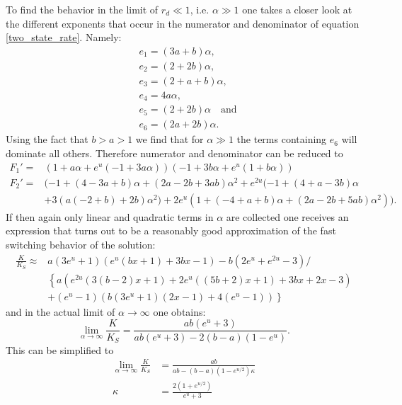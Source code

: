 To find the behavior in the limit of $r_d \ll 1 $, i.e. $\alpha \gg 1$ one takes a closer look at the different exponents that occur in the numerator and denominator of equation \eqref{two_state_rate}. Namely:
\begin{align}
& e_1 = (3a+b)\alpha, \nonumber \\
& e_2 = (2+2b)\alpha, \nonumber \\
& e_3 = (2+a+b)\alpha, \nonumber \\
& e_4 = 4a\alpha, \nonumber \\
& e_5 = (2+2b)\alpha \quad \textrm{and} \nonumber \\
& e_6 = (2a+2b)\alpha.
\end{align}
Using the fact that $b > a > 1$ we find that for $\alpha \gg 1$ the terms containing $e_6$ will dominate all others. Therefore numerator and denominator can be reduced to
\begin{align*}
    F_1' =& ( 1 + a \alpha + e^u (-1 + 3 a \alpha)) (-1 + 3 b \alpha + e^u (1 + b \alpha))\\
    F_2' =& (-1 + (4 - 3 a + b) \alpha + (2 a - 2 b + 3 a b) \alpha^2 + e^{2 u} (-1 + (4 + a - 3 b) \alpha \\
          &+ 3 (a (-2 + b) + 2 b) \alpha^2) + 2 e^u (1 + (-4 + a + b) \alpha + (2 a - 2 b + 5 a b) \alpha^2)).
\end{align*}
If then again only linear and quadratic terms in $\alpha$ are collected one receives an expression that turns out to be a reasonably good approximation of the fast switching behavior of the solution: 
\begin{align}
    \frac{K}{K_{S}} \approx &a \left(3 e^u+1\right) \left(e^u (b x+1)+3 b x-1\right)-b \left(2 e^u+e^{2 u}-3\right) / \nonumber \\
                          &\left\{a \left(e^{2 u} (3 (b-2) x+1)+2 e^u ((5 b+2) x+1)+3 b x+2 x-3\right) \right.  \nonumber \\
                          & \left. +\left(e^u-1\right) \left(b \left(3 e^u+1\right) (2 x-1)+4 \left(e^u-1\right)\right) \right\}
    \label{kla}
\end{align}
and in the actual limit of $\alpha \rightarrow \infty$ one obtains: 
\begin{equation}
    \lim_{\alpha \rightarrow \infty} \frac{K}{K_{S}} = \frac{a b \left(e^u+3\right)}{ab \left(e^u+3\right)-2(b-a)(1-e^u)}.
    \label{kliminfa}
\end{equation}
This can be simplified to 
\begin{align}
    \lim_{\alpha \rightarrow \infty} \frac{K}{K_S} &= \frac{ab}{ab - (b-a)(1-e^{u/2}) \kappa} \\
    \kappa &= \frac{2(1+e^{u/2})}{e^u + 3}
    \label{K_fast_limit_2}
\end{align}
